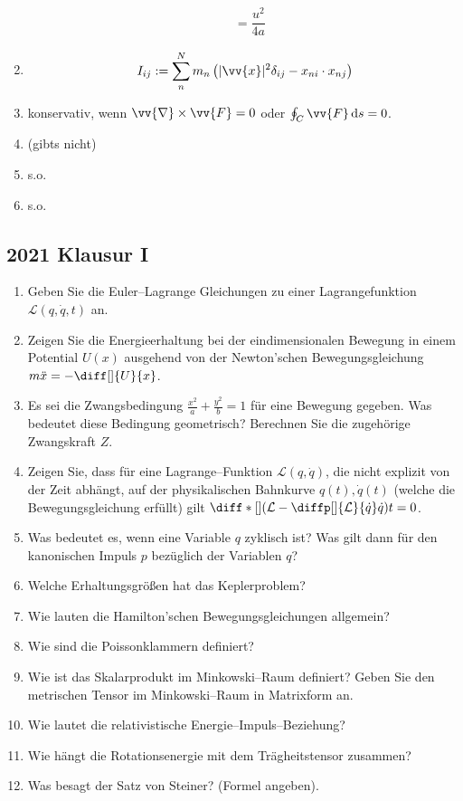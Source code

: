 \documentclass[a4paper,12pt]{article}
\newcommand{\td}{\,\text{d}}
\numberwithin{equation}{section}
\begin{document}
\begin{enumerate}[label=\arabic*.]
\begin{align*}
                                       &=\dfrac{u^2}{4a}
                \end{align*} 
        \item \begin{align*} 
                I_{ij}:=\sum_{n}^{N}m_n\left(|\vv{x}|^2\delta _{ij}-x_{ni}\cdot x_{nj}\right)
        \end{align*} 
        \item konservativ, wenn $\vv{\nabla }\times \vv{F}=0$ oder $\oint_{C}^{}\vv{F}\td s=0$.
        \item (gibts nicht)
        \item s.o.\
        \item s.o.\
\end{enumerate}

\newpage
\subsection{2021 Klausur I}
\begin{enumerate}[label=\arabic*.]
        \item Geben Sie die Euler--Lagrange Gleichungen zu einer Lagrangefunktion $\mathcal{L}\left(q,\dot{q},t\right)$ an.
        \item Zeigen Sie die Energieerhaltung bei der eindimensionalen Bewegung in einem Potential $U\left(x\right)$ ausgehend von der Newton'schen Bewegungsgleichung $m\ddot{x}=-\diff[]{U}{x}$.
        \item Es sei die Zwangsbedingung $\tfrac{x^2}{a}+\tfrac{y^2}{b}=1$ für eine Bewegung gegeben. Was bedeutet diese Bedingung geometrisch? Berechnen Sie die zugehörige Zwangskraft $Z$.
        \item Zeigen Sie, dass für eine Lagrange--Funktion $\mathcal{L}\left(q,\dot{q}\right)$, die nicht explizit von der Zeit abhängt, auf der physikalischen Bahnkurve $q\left(t\right),\dot{q}\left(t\right)$ (welche die Bewegungsgleichung erfüllt) gilt $\diff*[]{\left(\mathcal{L}-\diffp[]{\mathcal{L}}{\dot{q}}\dot{q}\right)}{t}=0$.
        \item Was bedeutet es, wenn eine Variable $q$ zyklisch ist? Was gilt dann für den kanonischen Impuls $p$ bezüglich der Variablen $q$?
        \item Welche Erhaltungsgrößen hat das Keplerproblem?
        \item Wie lauten die Hamilton'schen Bewegungsgleichungen allgemein?
        \item Wie sind die Poissonklammern definiert?
        \item Wie ist das Skalarprodukt im Minkowski--Raum definiert? Geben Sie den metrischen Tensor im Minkowski--Raum in Matrixform an.
        \item Wie lautet die relativistische Energie--Impuls--Beziehung?
        \item Wie hängt die Rotationsenergie mit dem Trägheitstensor zusammen?
        \item Was besagt der Satz von Steiner? (Formel angeben).
\end{enumerate}
\end{document}
